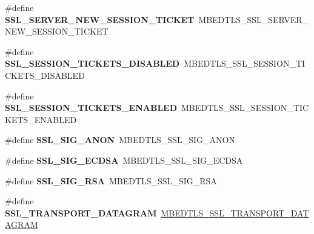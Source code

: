 \begin{DoxyCompactItemize}
\item 
\mbox{\label{compat-1_83_8h_a57536ae96ad54b96fa43bbb04c836e82}} 
\#define {\bfseries S\+S\+L\+\_\+\+S\+E\+R\+V\+E\+R\+\_\+\+N\+E\+W\+\_\+\+S\+E\+S\+S\+I\+O\+N\+\_\+\+T\+I\+C\+K\+ET}~M\+B\+E\+D\+T\+L\+S\+\_\+\+S\+S\+L\+\_\+\+S\+E\+R\+V\+E\+R\+\_\+\+N\+E\+W\+\_\+\+S\+E\+S\+S\+I\+O\+N\+\_\+\+T\+I\+C\+K\+ET
\item 
\mbox{\label{compat-1_83_8h_a5f213a5841510e97a4c7ee9d58403a75}} 
\#define {\bfseries S\+S\+L\+\_\+\+S\+E\+S\+S\+I\+O\+N\+\_\+\+T\+I\+C\+K\+E\+T\+S\+\_\+\+D\+I\+S\+A\+B\+L\+ED}~M\+B\+E\+D\+T\+L\+S\+\_\+\+S\+S\+L\+\_\+\+S\+E\+S\+S\+I\+O\+N\+\_\+\+T\+I\+C\+K\+E\+T\+S\+\_\+\+D\+I\+S\+A\+B\+L\+ED
\item 
\mbox{\label{compat-1_83_8h_a67615999624515739ca30912bf5b76fe}} 
\#define {\bfseries S\+S\+L\+\_\+\+S\+E\+S\+S\+I\+O\+N\+\_\+\+T\+I\+C\+K\+E\+T\+S\+\_\+\+E\+N\+A\+B\+L\+ED}~M\+B\+E\+D\+T\+L\+S\+\_\+\+S\+S\+L\+\_\+\+S\+E\+S\+S\+I\+O\+N\+\_\+\+T\+I\+C\+K\+E\+T\+S\+\_\+\+E\+N\+A\+B\+L\+ED
\item 
\mbox{\label{compat-1_83_8h_a733760de6baaa13ccac093ee771d7079}} 
\#define {\bfseries S\+S\+L\+\_\+\+S\+I\+G\+\_\+\+A\+N\+ON}~M\+B\+E\+D\+T\+L\+S\+\_\+\+S\+S\+L\+\_\+\+S\+I\+G\+\_\+\+A\+N\+ON
\item 
\mbox{\label{compat-1_83_8h_a04b4f34dc02fbd2da44ab8b9dff6b10f}} 
\#define {\bfseries S\+S\+L\+\_\+\+S\+I\+G\+\_\+\+E\+C\+D\+SA}~M\+B\+E\+D\+T\+L\+S\+\_\+\+S\+S\+L\+\_\+\+S\+I\+G\+\_\+\+E\+C\+D\+SA
\item 
\mbox{\label{compat-1_83_8h_ac4b8439b3f7e4a686b3482b1b64ac646}} 
\#define {\bfseries S\+S\+L\+\_\+\+S\+I\+G\+\_\+\+R\+SA}~M\+B\+E\+D\+T\+L\+S\+\_\+\+S\+S\+L\+\_\+\+S\+I\+G\+\_\+\+R\+SA
\item 
\mbox{\label{compat-1_83_8h_a8c427b76b224393c29423a318dbd9997}} 
\#define {\bfseries S\+S\+L\+\_\+\+T\+R\+A\+N\+S\+P\+O\+R\+T\+\_\+\+D\+A\+T\+A\+G\+R\+AM}~\mbox{\hyperlink{ssl_8h_ac00527bc4661e5d7f2df5e7e96a6a896}{M\+B\+E\+D\+T\+L\+S\+\_\+\+S\+S\+L\+\_\+\+T\+R\+A\+N\+S\+P\+O\+R\+T\+\_\+\+D\+A\+T\+A\+G\+R\+AM}}
\item 
\mbox{\label{compat-1_83_8h_a14291ec8216dfd0e6d6ce2b9fcbd5a8f}} 

\end{DoxyCompactItemize}
